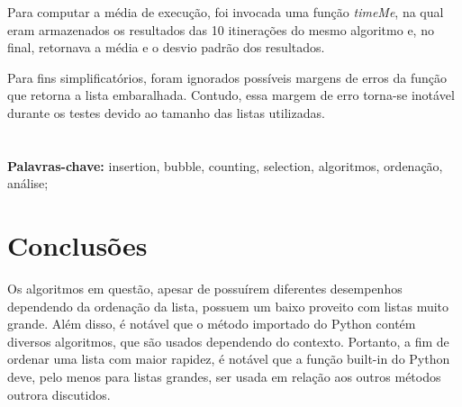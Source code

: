 \documentclass[10pt,a4paper]{article}
\begin{document}
Para computar a média de execução, foi invocada uma função \textit{timeMe}, na qual eram armazenados os resultados das 10 itinerações do mesmo algoritmo e, no final, retornava a média e o desvio padrão dos resultados.

Para fins simplificatórios, foram ignorados possíveis margens de erros da função que retorna a lista embaralhada. Contudo, essa margem de erro torna-se inotável durante os testes devido ao tamanho das listas utilizadas.
\\
\\
\\
\noindent\textbf{Palavras-chave:} insertion, bubble, counting, selection, algoritmos, ordenação, análise;

\newpage
\tableofcontents








\section*{Conclusões}
Os algoritmos em questão, apesar de possuírem diferentes desempenhos dependendo da ordenação da lista, possuem um baixo proveito com listas muito grande. Além disso, é notável que o método importado do Python contém diversos algoritmos, que são usados dependendo do contexto.
Portanto, a fim de ordenar uma lista com maior rapidez, é notável que a função built-in do Python deve, pelo menos para listas grandes, ser usada em relação aos outros métodos outrora discutidos.
\end{document}
